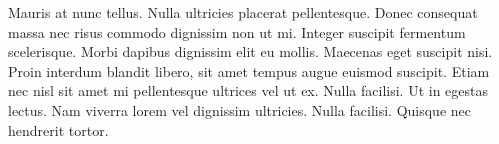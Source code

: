 Mauris at nunc tellus. Nulla ultricies placerat pellentesque. Donec consequat massa nec risus commodo dignissim non ut mi. Integer suscipit fermentum scelerisque. Morbi dapibus dignissim elit eu mollis. Maecenas eget suscipit nisi. Proin interdum blandit libero, sit amet tempus augue euismod suscipit. Etiam nec nisl sit amet mi pellentesque ultrices vel ut ex. Nulla facilisi. Ut in egestas lectus. Nam viverra lorem vel dignissim ultricies. Nulla facilisi. Quisque nec hendrerit tortor. 